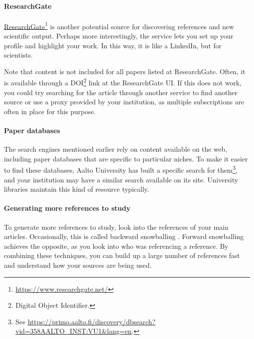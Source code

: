 
\paragraph{ResearchGate}

\href{https://www.researchgate.net/}{Research\-Gate}\footnote{\url{https://www.researchgate.net/}} is another potential source for discovering references and new scientific output.
Perhaps more interestingly, the service lets you set up your profile and highlight your work.
In this way, it is like a LinkedIn, but for scientists.

Note that content is not included for all papers listed at Research\-Gate.
Often, it is available through a DOI\footnote{Digital Object Identifier.} link at the Research\-Gate UI.
If this does not work, you could try searching for the article through another service to find another source or use a proxy provided by your institution, as multiple subscriptions are often in place for this purpose.

\paragraph{Paper databases}

The search engines mentioned earlier rely on content available on the web, including paper databases that are specific to particular niches.
To make it easier to find these databases, Aalto University has built a specific search for them\footnote{See \url{https://primo.aalto.fi/discovery/dbsearch?vid=358AALTO_INST:VU1&lang=en}.}, and your institution may have a similar search available on its site.
University libraries maintain this kind of resource typically.

\paragraph{Generating more references to study}

To generate more references to study, look into the references of your main articles.
Occasionally, this is called backward snowballing \citep{jalali2012systematic}.
Forward snowballing \citep{jalali2012systematic} achieves the opposite, as you look into who was referencing a reference.
By combining these techniques, you can build up a large number of references fast and understand how your sources are being used.

